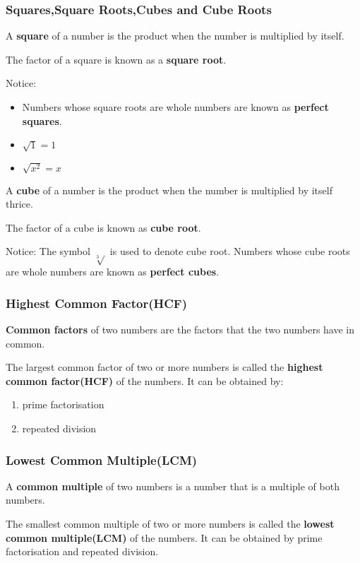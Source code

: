 \documentclass[../main]{subfiles}
\begin{document}
\subsubsection{Squares,Square Roots,Cubes and Cube Roots}
A \textbf{square} of a number is the product when the number is multiplied by
itself.

The factor of a square is known as a \textbf{square root}.

Notice: \begin{itemize}
  \item Numbers whose square roots are whole numbers are known as
\textbf{perfect squares}.
\item $\sqrt{1}=1$
\item $\sqrt{x^2}=x$
\end{itemize}

A \textbf{cube} of a number is the product when the number is multiplied by
itself thrice.

The factor of a cube is known as \textbf{cube root}.

Notice: The symbol $\sqrt[3]{}$ is used to denote cube root.
Numbers whose cube roots are whole numbers are known as \textbf{perfect cubes}.

\subsubsection{Highest Common Factor(HCF)}
\textbf{Common factors} of two numbers are the factors that the two numbers have
in common.

The largest common factor of two or more numbers is called the \textbf{highest
  common factor(HCF)} of the numbers. It can be obtained by: 
\begin{enumerate}
\item prime factorisation
  \item repeated division
\end{enumerate}

\subsubsection{Lowest Common Multiple(LCM)}
A \textbf{common multiple} of two numbers is a number that is a multiple of both
numbers.

The smallest common multiple of two or more numbers is called the \textbf{lowest
  common multiple(LCM)} of the numbers. It can be obtained by prime
factorisation and repeated division.
\end{document}

